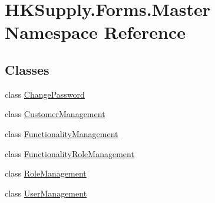 \hypertarget{namespace_h_k_supply_1_1_forms_1_1_master}{}\section{H\+K\+Supply.\+Forms.\+Master Namespace Reference}
\label{namespace_h_k_supply_1_1_forms_1_1_master}
\subsection*{Classes}
\begin{DoxyCompactItemize}
\item 
class \hyperlink{class_h_k_supply_1_1_forms_1_1_master_1_1_change_password}{Change\+Password}
\item 
class \hyperlink{class_h_k_supply_1_1_forms_1_1_master_1_1_customer_management}{Customer\+Management}
\item 
class \hyperlink{class_h_k_supply_1_1_forms_1_1_master_1_1_functionality_management}{Functionality\+Management}
\item 
class \hyperlink{class_h_k_supply_1_1_forms_1_1_master_1_1_functionality_role_management}{Functionality\+Role\+Management}
\item 
class \hyperlink{class_h_k_supply_1_1_forms_1_1_master_1_1_role_management}{Role\+Management}
\item 
class \hyperlink{class_h_k_supply_1_1_forms_1_1_master_1_1_user_management}{User\+Management}
\end{DoxyCompactItemize}
